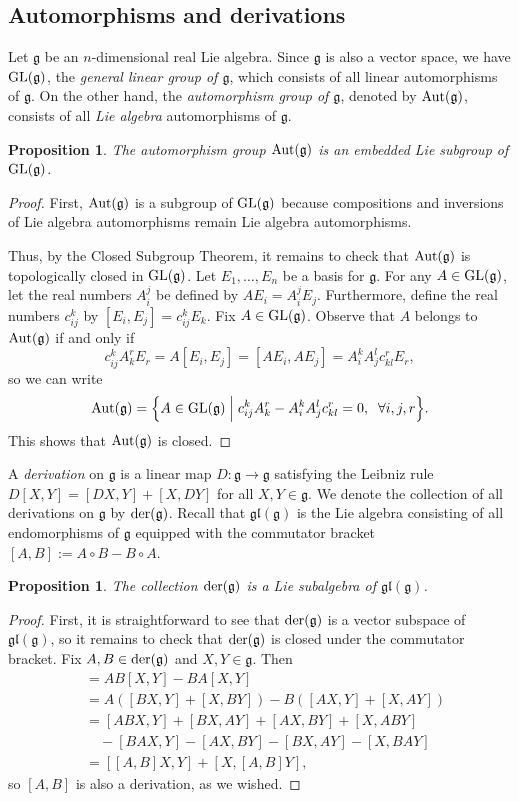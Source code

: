 \documentclass{amsart}
\newcommand{\der}{\text{\normalfont der}}
\newcommand{\aut}{\text{\normalfont Aut}}
\newcommand{\GL}{\text{\normalfont GL}}
\newcommand{\gl}{\mathfrak{gl}}
\newcommand{\g}{\mathfrak g}
\theoremstyle{plain}
\newtheorem{proposition}[theorem]{Proposition}
\theoremstyle{definition}
\theoremstyle{remark}
\begin{document}
	\subsection{Automorphisms and derivations}
	Let $\g$ be an $n$-dimensional real Lie algebra. Since $\g$ is also a vector space, we have $\GL(\g)$, the \emph{general linear group of $\g$}, which consists of all linear automorphisms of $\g$. On the other hand, the \emph{automorphism group of $\g$}, denoted by $\aut(\g)$, consists of all \emph{Lie algebra} automorphisms of $\g$.
	\begin{proposition}
		The automorphism group $\aut(\g)$ is an embedded Lie subgroup of $\GL(\g)$.
	\end{proposition}
	\begin{proof}
		First, $\aut(\g)$ is a subgroup of $\GL(\g)$ because compositions and inversions of Lie algebra automorphisms remain Lie algebra automorphisms.
		
		Thus, by the Closed Subgroup Theorem, it remains to check that $\aut(\g)$ is topologically closed in $\GL(\g)$. Let $E_1,\ldots,E_n$ be a basis for $\g$. For any $A \in \GL(\g)$, let the real numbers $A_i^j$ be defined by $A E_i = A_i^j E_j$. Furthermore, define the real numbers $c_{ij}^k$ by $[E_i, E_j] = c_{ij}^k E_k$. Fix $A \in \GL(\g)$. Observe that $A$ belongs to $\aut(\g)$ if and only if 
		$$c_{ij}^k A_k^r E_r = A[E_i, E_j] = [A E_i, AE_j] = A_i^k A_j^l c_{kl}^r E_r,$$
		so we can write 
		$$\aut(\g) = \Big\{ A \in \GL(\g) \; \Big| \; c_{ij}^k A_k^r - A_i^k A_j^l c_{kl}^r = 0 ,\;\; \forall i,j,r\Big\}.$$
		This shows that $\aut(\g)$ is closed.
	\end{proof}
	
	A \emph{derivation} on $\g$ is a linear map $D:\g \rightarrow \g$ satisfying the Leibniz rule $D[X,Y] = [DX,Y] + [X,DY]$ for all $X,Y \in \g$. We denote the collection of all derivations on $\g$ by $\der(\g)$. Recall that $\gl(\g)$ is the Lie algebra consisting of all endomorphisms of $\g$ equipped with the commutator bracket $[A,B] := A \circ B - B \circ A$.
	
	\begin{proposition}
		The collection $\der(\g)$ is a Lie subalgebra of $\gl(\g)$. 
	\end{proposition}
	\begin{proof}
		First, it is straightforward to see that $\der(\g)$ is a vector subspace of $\gl(\g)$, so it remains to check that $\der(\g)$ is closed under the commutator bracket. Fix $A,B \in \der(\g)$ and $X,Y \in \g$. Then 
		\begin{align*}
			[A,B][X,Y] &= AB[X,Y] - BA[X,Y]  \\
			&= A([BX,Y] + [X,BY]) - B([AX,Y] + [X,AY])  \\
			&=[ABX,Y] + [BX,AY] + [AX,BY] + [X,ABY] \\
			&\quad- [BAX,Y] - [AX,BY] - [BX,AY] - [X,BAY] \\
			&= [[A,B]X,Y] + [X,[A,B]Y],
		\end{align*}
		so $[A,B]$ is also a derivation, as we wished.
	\end{proof}
	
\end{document}
